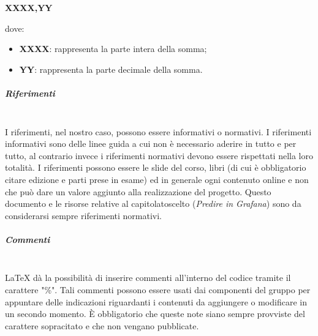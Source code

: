                     \centerline{\textbf{XXXX,YY}} \newline \newline
                    dove:
                    \begin{itemize}
                        \item \textbf{XXXX}: rappresenta la parte intera della somma;
                        \item \textbf{YY}: rappresenta la parte decimale della somma.
                    \end{itemize}
                \subparagraph{Riferimenti}\mbox{}\\ [1mm]
                    I riferimenti, nel nostro caso, possono essere informativi o normativi. I riferimenti informativi sono delle linee guida a cui non è necessario aderire in tutto e per tutto, al contrario invece i riferimenti normativi devono essere rispettati nella loro totalità. I riferimenti possono essere le slide del corso, libri (di cui è obbligatorio citare edizione e parti prese in esame) ed in generale ogni contenuto online e non che può dare un valore aggiunto alla realizzazione del progetto\glo. Questo documento e le risorse relative al capitolato\glosp scelto (\textit{Predire in Grafana}) sono da considerarsi sempre riferimenti normativi.
                \subparagraph{Commenti}\mbox{}\\ [1mm]
                    \LaTeX\xspace dà la possibilità di inserire commenti all'interno del codice tramite il carattere "\%". Tali commenti possono essere usati dai componenti del gruppo per appuntare delle indicazioni riguardanti i contenuti da aggiungere o modificare in un secondo momento. È obbligatorio che queste note siano sempre provviste del carattere sopracitato e che non vengano pubblicate.
